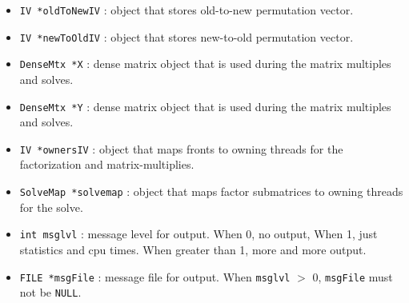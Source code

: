 \begin{itemize}
\item
{\tt IV *oldToNewIV} : object that stores old-to-new permutation vector.
\item
{\tt IV *newToOldIV} : object that stores new-to-old permutation vector.
\item
{\tt DenseMtx *X} : dense matrix object that is used during the matrix
multiples and solves.
\item
{\tt DenseMtx *Y} : dense matrix object that is used during the matrix
multiples and solves.
\item
{\tt IV *ownersIV} : object that maps fronts to owning threads
for the factorization and matrix-multiplies.
\item
{\tt SolveMap *solvemap} : object that maps factor submatrices to
owning threads for the solve.
\item
{\tt int msglvl} : message level for output.
When 0, no output, When 1, just statistics and cpu times.
When greater than 1, more and more output.
\item
{\tt FILE *msgFile} : message file for output.
When \texttt{msglvl} $>$ 0, \texttt{msgFile} must not be \texttt{NULL}.
\end{itemize}
\par
